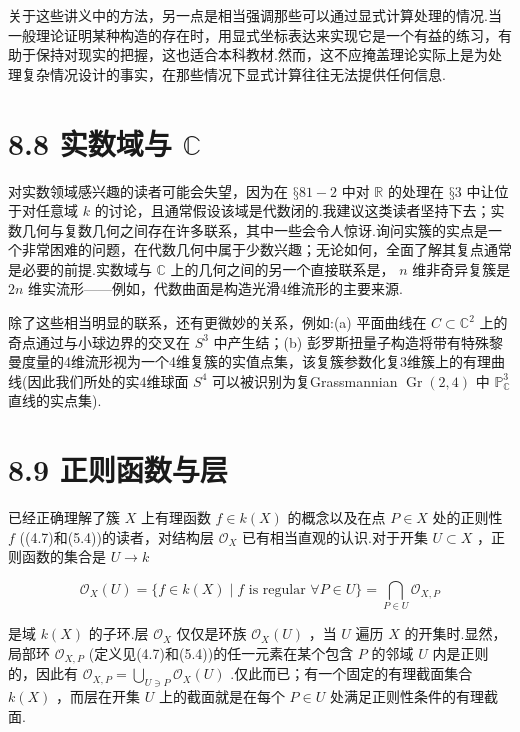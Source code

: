 关于这些讲义中的方法，另一点是相当强调那些可以通过显式计算处理的情况.当一般理论证明某种构造的存在时，用显式坐标表达来实现它是一个有益的练习，有助于保持对现实的把握，这也适合本科教材.然而，这不应掩盖理论实际上是为处理复杂情况设计的事实，在那些情况下显式计算往往无法提供任何信息.

\section{8.8 实数域与 \(\mathbb{C}\)}

对实数领域感兴趣的读者可能会失望，因为在 \(§{81} - 2\) 中对 \(\mathbb{R}\) 的处理在 \(§3\) 中让位于对任意域 \(k\) 的讨论，且通常假设该域是代数闭的.我建议这类读者坚持下去；实数几何与复数几何之间存在许多联系，其中一些会令人惊讶.询问实簇的实点是一个非常困难的问题，在代数几何中属于少数兴趣；无论如何，全面了解其复点通常是必要的前提.实数域与 \(\mathbb{C}\) 上的几何之间的另一个直接联系是， \(n\) 维非奇异复簇是 \({2n}\) 维实流形——例如，代数曲面是构造光滑4维流形的主要来源.

除了这些相当明显的联系，还有更微妙的关系，例如:(a) 平面曲线在 \(C \subset  {\mathbb{C}}^{2}\) 上的奇点通过与小球边界的交叉在 \({S}^{3}\) 中产生结；(b) 彭罗斯扭量子构造将带有特殊黎曼度量的4维流形视为一个4维复簇的实值点集，该复簇参数化复3维簇上的有理曲线(因此我们所处的实4维球面 \({S}^{4}\) 可以被识别为复Grassmannian \(\operatorname{Gr}\left( {2,4}\right)\) 中 \({\mathbb{P}}_{\mathbb{C}}^{3}\) 直线的实点集).

\section{8.9 正则函数与层}

已经正确理解了簇 \(X\) 上有理函数 \(f \in  k\left( X\right)\) 的概念以及在点 \(P \in  X\) 处的正则性 \(f\) ((4.7)和(5.4))的读者，对结构层 \({\mathcal{O}}_{X}\) 已有相当直观的认识.对于开集 \(U \subset  X\) ，正则函数的集合是 \(U \rightarrow  k\)

\[
{\mathcal{O}}_{X}\left( U\right)  = \{ f \in  k\left( X\right)  \mid  f\text{ is regular }\forall P \in  U\}  = \mathop{\bigcap }\limits_{{P \in  U}}{\mathcal{O}}_{X,P}
\]

是域 \(k\left( X\right)\) 的子环.层 \({\mathcal{O}}_{X}\) 仅仅是环族 \({\mathcal{O}}_{X}\left( U\right)\) ，当 \(U\) 遍历 \(X\) 的开集时.显然，局部环 \({\mathcal{O}}_{X,P}\) (定义见(4.7)和(5.4))的任一元素在某个包含 \(P\) 的邻域 \(U\) 内是正则的，因此有 \({\mathcal{O}}_{X,P} = \mathop{\bigcup }\limits_{{U \ni  P}}{\mathcal{O}}_{X}\left( U\right)\) .仅此而已；有一个固定的有理截面集合 \(k\left( X\right)\) ，而层在开集 \(U\) 上的截面就是在每个 \(P \in  U\) 处满足正则性条件的有理截面.

